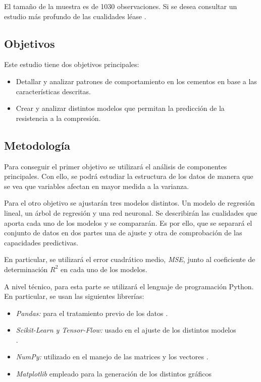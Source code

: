 \noindent El tamaño de la muestra es de 1030 observaciones. Si se desea consultar un estudio más profundo de las cualidades léase \cite{Yeh 1998}.

\subsection*{Objetivos}

\noindent Este estudio tiene dos objetivos principales:
\begin{itemize}
\item Detallar y analizar patrones de comportamiento en los cementos en base a las características descritas. 
\item Crear y analizar distintos modelos que permitan la predicción de la resistencia a la compresión. 
\end{itemize}
\subsection*{Metodología}

\noindent Para conseguir el primer objetivo se utilizará el análisis de componentes principales. Con ello, se podrá estudiar la estructura de los datos de manera que se vea que variables afectan en mayor medida a la varianza. 

\noindent Para el otro objetivo se ajustarán   tres modelos distintos. Un modelo de regresión lineal, un árbol de regresión y una red neuronal. Se describirán las cualidades que aporta cada uno de los modelos y se compararán. Es por ello,  que se separará el conjunto de datos en dos partes una de ajuste y otra de comprobación de las capacidades predictivas. 

\noindent En particular, se utilizará el error cuadrático medio, \emph{MSE}, junto al coeficiente de determinación $R^2$ en cada uno de los modelos. 

\noindent A nivel técnico, para esta parte se utilizará el lenguaje de programación Python. En particular, se usan las siguientes librerías:
\begin{itemize}
\item \emph{Pandas:} para el tratamiento previo de los datos \cite{Pandas}. 
\item \emph{Scikit-Learn y Tensor-Flow:} usado en el ajuste de los distintos modelos \\ \cite{Scikit-Learn, TensorFlow}. 
\item \emph{NumPy:} utilizado en el manejo de las matrices y los vectores \cite{Numpy}. 
\item \emph{Matplotlib} empleado para la generación de los distintos gráficos \cite{Matplotlib}
\end{itemize}

